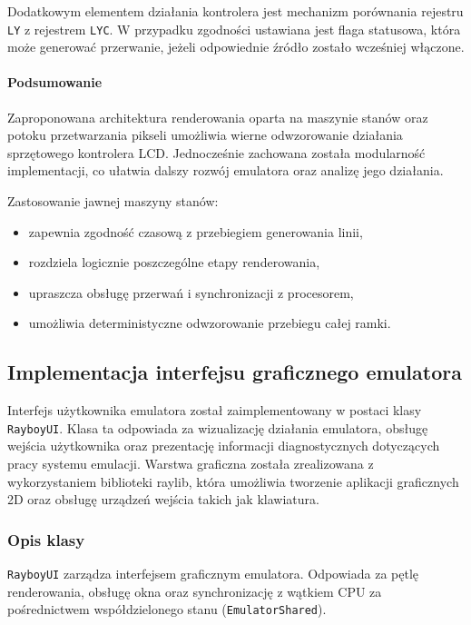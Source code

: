 \documentclass{article}
\begin{document}
Dodatkowym elementem działania kontrolera jest mechanizm porównania rejestru \texttt{LY} z rejestrem \texttt{LYC}. W przypadku zgodności ustawiana jest flaga statusowa, która może generować przerwanie, jeżeli odpowiednie źródło zostało wcześniej włączone.

\paragraph{Podsumowanie}

Zaproponowana architektura renderowania oparta na maszynie stanów oraz potoku przetwarzania pikseli umożliwia wierne odwzorowanie działania sprzętowego kontrolera LCD. Jednocześnie zachowana została modularność implementacji, co ułatwia dalszy rozwój emulatora oraz analizę jego działania.

Zastosowanie jawnej maszyny stanów:

\begin{itemize}
	\item zapewnia zgodność czasową z przebiegiem generowania linii,
	\item rozdziela logicznie poszczególne etapy renderowania,
	\item upraszcza obsługę przerwań i synchronizacji z procesorem,
	\item umożliwia deterministyczne odwzorowanie przebiegu całej ramki.
\end{itemize}

\subsection{Implementacja interfejsu graficznego emulatora}

Interfejs użytkownika emulatora został zaimplementowany w postaci klasy \texttt{RayboyUI}. 
Klasa ta odpowiada za wizualizację działania emulatora, obsługę wejścia użytkownika 
oraz prezentację informacji diagnostycznych dotyczących pracy systemu emulacji. 
Warstwa graficzna została zrealizowana z wykorzystaniem biblioteki raylib, która 
umożliwia tworzenie aplikacji graficznych 2D oraz obsługę urządzeń wejścia takich 
jak klawiatura.

\subsubsection{Opis klasy}

\texttt{RayboyUI} zarządza interfejsem graficznym emulatora. Odpowiada za pętlę renderowania, obsługę okna oraz synchronizację z wątkiem CPU za pośrednictwem współdzielonego stanu (\texttt{EmulatorShared}).
\end{document}
